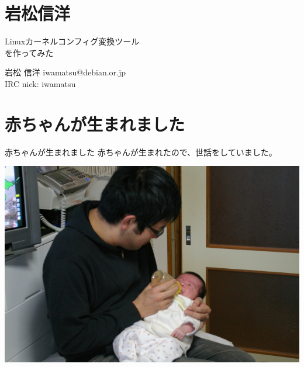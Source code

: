 
\section{岩松信洋}

\begin{frame}{}

\begin{center}
  Linuxカーネルコンフィグ変換ツール\\を作ってみた

\vspace{1em}

 岩松 信洋 iwamatsu@debian.or.jp\\IRC nick: iwamatsu

\end{center}

\end{frame}

\section{赤ちゃんが生まれました}
\begin{frame}[containsverbatim]{赤ちゃんが生まれました}
赤ちゃんが生まれたので、世話をしていました。
 \begin{center}
 \includegraphics[scale=0.5]{image200901/baby.jpg}
 \label{fig:baby}
 \end{center}
\end{frame}

